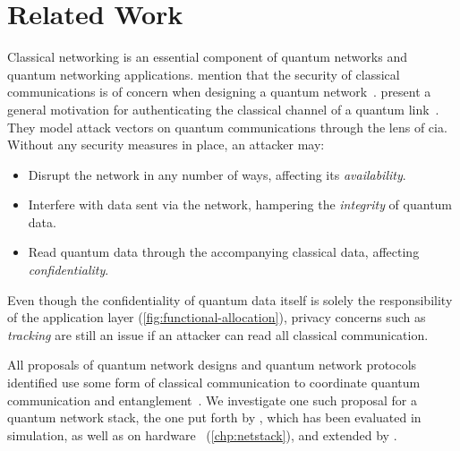 \section{Related Work}
\label{sec:doa:relwork}

Classical networking is an essential component of quantum networks and quantum networking
applications. \citeauthor{kozlowski_2019_towards} mention that the security of classical
communications is of concern when designing a quantum network~\cite{kozlowski_2019_towards}.
\citeauthor{satoh_2020_attacking} present a general motivation for authenticating the classical
channel of a quantum link~\cite{satoh_2020_attacking}. They model attack vectors on quantum
communications through the lens of \acrfull{cia}. Without any security measures in place, an
attacker may:

\begin{itemize}
    \item Disrupt the network in any number of ways, affecting its \emph{availability}.
    \item Interfere with data sent via the network, hampering the \emph{integrity} of quantum data.
    \item Read quantum data through the accompanying classical data, affecting
          \emph{confidentiality}.
\end{itemize}
Even though the confidentiality of quantum data itself is solely the responsibility of the
application layer (\cref{fig:functional-allocation}), privacy concerns such as \emph{tracking} are
still an issue if an attacker can read all classical communication.

All proposals of quantum network designs and quantum network protocols identified use some form of
classical communication to coordinate quantum communication and
entanglement~\cite{van_meter_2013_repeaters, schoute_2016_shortcuts, joshi_2020_trusted,
pirker_2019_quantum, kozlowski_2019_towards, dahlberg_2019_egp, kozlowski_2020_qnp}. We investigate
one such proposal for a quantum network stack, the one put forth by \textcite{dahlberg_2019_egp},
which has been evaluated in simulation, as well as on hardware~\cite{pompili_2022_experimental}
(\cref{chp:netstack}), and extended by \textcite{kozlowski_2020_qnp}.

